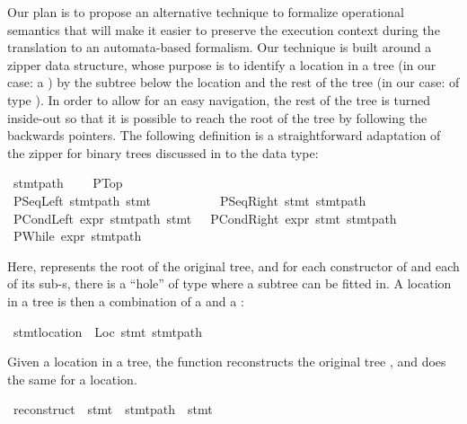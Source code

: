 \begin{isabellebody}\def\isabellecontext{Zipper}\isadelimtheory
\endisadelimtheory
\isatagtheory
\endisatagtheory
{\isafoldtheory}\isadelimtheory
\endisadelimtheory
{}
\isamarkuptrue {}
\isamarkuptrue \begin{isamarkuptext}Our plan is to propose an alternative technique to formalize operational 
semantics that will make it easier to preserve the execution context during
the translation to an automata-based formalism. Our technique is built around a zipper
data structure, whose purpose is to identify a location in a tree (in our
case: a ) by the subtree below the location and the rest of the
tree (in our case: of type ).  In order to allow for an easy
navigation, the rest of the tree is turned inside-out so that it is possible
to reach the root of the tree by following the backwards pointers.
The following definition is a straightforward adaptation of the zipper for
binary trees discussed in \cite{Huet_zipper:1997} to the  data
type:\end{isamarkuptext}\isamarkuptrue {}\isamarkupfalse \ stmt{\isacharunderscore}path\ {\isacharequal}\ \isanewline
\ \ PTop\isanewline
{\isacharbar}\ PSeqLeft\ stmt{\isacharunderscore}path\ stmt\ \ \ \ \ \ \ \ \ \ {\isacharbar}\ PSeqRight\ stmt\ stmt{\isacharunderscore}path\isanewline
{\isacharbar}\ PCondLeft\ expr\ stmt{\isacharunderscore}path\ stmt\ \ {\isacharbar}\ PCondRight\ expr\ stmt\ stmt{\isacharunderscore}path\isanewline
{\isacharbar}\ PWhile\ expr\ stmt{\isacharunderscore}path\begin{isamarkuptext}Here,  represents the root of the original tree, and for
each constructor of  and each of its sub-s, there is a
``hole'' of type  where a subtree can be fitted in. A
location in a tree is then a combination of a  and a :\end{isamarkuptext}\isamarkuptrue {}\isamarkupfalse \ stmt{\isacharunderscore}location\ {\isacharequal}\ Loc\ stmt\ stmt{\isacharunderscore}path\begin{isamarkuptext}Given a location in a tree, the function  reconstructs the
 original tree , and  does the same for a location.\end{isamarkuptext}\isamarkuptrue {}\isamarkupfalse \ reconstruct\ {\isacharcolon}{\isacharcolon}\ {\isachardoublequoteopen}stmt\ {\isasymRightarrow}\ stmt{\isacharunderscore}path\ {\isasymRightarrow}\ stmt{\isachardoublequoteclose}\ \isanewline

\end{isabellebody}
